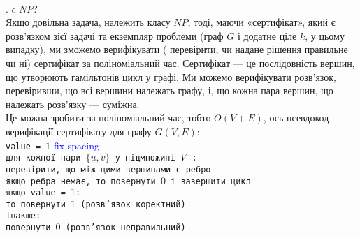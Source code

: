 \documentclass[14pt]{article}
\begin{document}
\begin{spacing}{1.175}
    \\
    . \hamcycle \(\epsilon\) \(NP\)?\\
        Якщо довільна задача, належить класу \(NP\), тоді, маючи «сертифікат», який є розв'язком зієї задачі та екземпляр проблеми (граф \(G\) і додатне ціле \(k\), у цьому випадку), ми зможемо верифікувати ( перевірити, чи надане рішення правильне чи ні) сертифікат за поліноміальний час. Сертифікат — це послідовність вершин, що утворюють гамільтонів цикл у графі. Ми можемо верифікувати розв'язок, перевіривши, що всі вершини належать графу, і, що кожна пара вершин, що належать розв’язку — суміжна.\\ Це можна зробити за поліноміальний час, тобто \(O(V + E)\), ось
        псевдокод верифікації сертифікату для графу \(G(V, E)\):
        \\
            
        \quad \texttt{value = \(1\)} \textcolor{blue}{ fix spacing} 
        \\
        
        \quad \texttt{для кожної пари \( \{u, v\}\) у підмножині \(V`\):}
        \\
        
        \quad \texttt{\quad перевірити, що між цими вершинами є ребро}
        \\
        
        \quad \texttt{\quad якщо ребра немає, то повернути \(0\) і завершити цикл}
        \\
        
        \quad \texttt{якщо value = \(1\):}
        \\
        
        \quad \texttt{\quad то повернути \(1\) (розв'язок коректний)}
        \\

        \quad \texttt{інакше:}
        \\
        
        \quad \texttt{\quad повернути \(0\) (розв'язок неправильний)}\\
        \\
        

\end{spacing}
\end{document}
